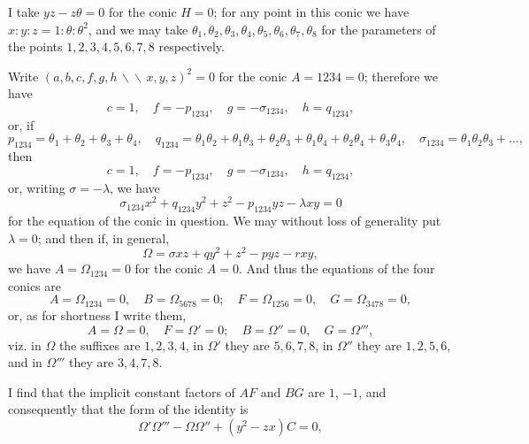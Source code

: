 \documentclass[11pt,a4paper]{book}
\begin{document}
I take $yz - z\theta = 0$ for the conic $H = 0$; for any point in this conic we have
$x : y : z = 1 : \theta : \theta^2$, and we may take $\theta_1, \theta_2, \theta_3, \theta_4, \theta_5, \theta_6, \theta_7, \theta_8$
for the parameters of the points $1, 2, 3, 4, 5, 6, 7, 8$ respectively.

Write $(a, b, c, f, g, h \,\backslash\!\!\backslash\, x, y, z)^2 = 0$ for the conic $A = 1234 = 0$;
therefore we have
\[
c = 1, \quad f = -p_{1234}, \quad g = -\sigma_{1234}, \quad h = q_{1234},
\]
or, if
\[
p_{1234} = \theta_1 + \theta_2 + \theta_3 + \theta_4, \quad
q_{1234} = \theta_1\theta_2 + \theta_1\theta_3 + \theta_2\theta_3 + \theta_1\theta_4 + \theta_2\theta_4 + \theta_3\theta_4, \quad
\sigma_{1234} = \theta_1\theta_2\theta_3 + \ldots,
\]
then
\[
c = 1, \quad f = -p_{1234}, \quad g = -\sigma_{1234}, \quad h = q_{1234},
\]
or, writing $\sigma = -\lambda$, we have
\[
\sigma_{1234} x^2 + q_{1234} y^2 + z^2 - p_{1234} yz - \lambda xy = 0
\]
for the equation of the conic in question. We may without loss of generality put
$\lambda = 0$; and then if, in general,
\[
\Omega = \sigma xz + q y^2 + z^2 - py z - r xy,
\]
we have $A = \Omega_{1234} = 0$ for the conic $A = 0$. And thus the equations of the four
conics are
\[
A = \Omega_{1234} = 0, \quad B = \Omega_{5678} = 0; \quad
F = \Omega_{1256} = 0, \quad G = \Omega_{3478} = 0,
\]
or, as for shortness I write them,
\[
A = \Omega = 0, \quad F = \Omega' = 0; \quad B = \Omega'' = 0, \quad G = \Omega''',
\]
viz. in $\Omega$ the suffixes are $1, 2, 3, 4$, in $\Omega'$ they are $5, 6, 7, 8$, in $\Omega''$ they are $1, 2, 5, 6$,
and in $\Omega'''$ they are $3, 4, 7, 8$.

I find that the implicit constant factors of $AF$ and $BG$ are $1$, $-1$, and consequently
that the form of the identity is
\[
\Omega'\Omega''' - \Omega\Omega'' + (y^2 - zx)C = 0,
\]
\end{document}
